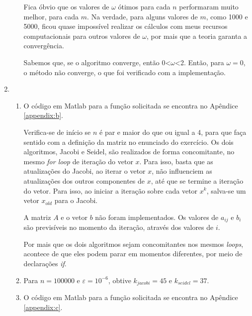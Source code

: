 \documentclass{article}
\begin{document}
\begin{enumerate}
\begin{enumerate}
                    Fica óbvio que os valores de $\omega$ ótimos para cada $n$ performaram muito melhor, para cada $m$.
                    Na verdade, para alguns valores de $m$, como 1000 e 5000, ficou quase impossível realizar os cálculos com meus recursos computacionais para outros valores de $\omega$,
                    por mais que a teoria garanta a convergência.
                    
                    Sabemos que, se o algoritmo converge, então 0<$\omega$<2. Então, para $\omega=0$, o
                    método não converge, o que foi verificado com a implementação.
                    
            \end{enumerate}
            
        \item \begin{enumerate}
                \item O código em Matlab para a função solicitada se encontra no Apêndice \ref{appendix:b}.
                
                    Verifica-se de início se $n$ é par e maior do que ou igual a 4, para que faça sentido com a definição da matriz
                    no enunciado do exercício. Os dois algoritmos, Jacobi e Seidel, são realizados de forma concomitante,
                    no mesmo \textit{for loop} de iteração do vetor $x$. Para isso, basta que as atualizações do Jacobi, ao iterar o vetor $x$, não influenciem as atualizações
                    dos outros componentes de $x$, até que se termine a iteração do vetor. Para isso, ao iniciar a iteração sobre cada vetor $x^{k}$, salva-se um vetor
                    $x_{old}$ para o Jacobi.

                    A matriz $A$ e o vetor $b$ não foram implementados. Os valores de $a_{ij}$ e $b_i$ são previsíveis no momento
                    da iteração, através dos valores de $i$.

                    Por mais que os dois algoritmos sejam concomitantes nos mesmos \textit{loops}, acontece de que eles podem parar em momentos diferentes,
                    por meio de declarações \textit{if}.

                \item Para $n=100000$ e $\varepsilon=10^{-6}$, obtive $k_{jacobi}=45$ e $k_{seidel}=37$.
                
                \item O código em Matlab para a função solicitada se encontra
                    no Apêndice \ref{appendix:c}.


\end{enumerate}
\end{enumerate}
\end{document}
